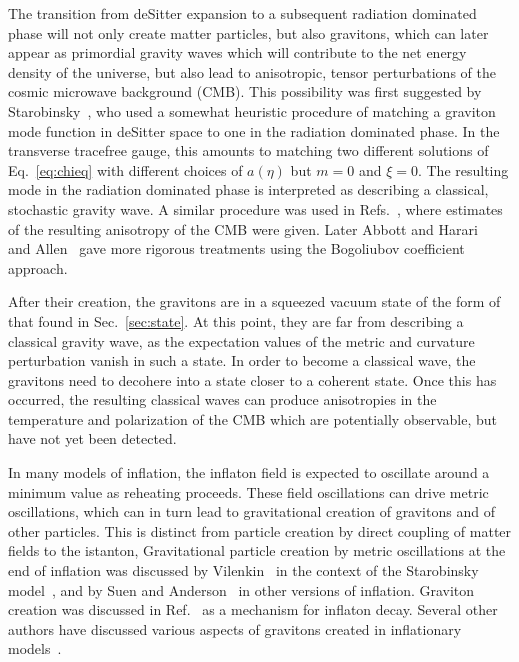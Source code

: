 \documentclass[12pt,onecolumn,eqsecnum,floats,aps,prd,floatfix,titlepage]{revtex4-2}
\begin{document}
The transition from deSitter expansion to a subsequent radiation dominated phase will not only create matter particles,
but also gravitons, which can later appear as primordial gravity waves which will contribute to the net energy density
of the universe, but also lead to anisotropic, tensor perturbations of the cosmic microwave background (CMB). This possibility
was first suggested by Starobinsky~\cite{S79}, who used a  somewhat heuristic procedure of matching  a graviton mode
function in deSitter space to one in the radiation dominated phase. In the transverse tracefree gauge, this amounts to
matching two different solutions of Eq.~\eqref{eq:chieq} with different choices of $a(\eta)$ but $m=0$ and $\xi =0$.
The resulting mode in the radiation dominated phase  is interpreted as describing a classical, stochastic gravity wave.
A similar procedure was used in Refs.~\cite{RSV82,FP83,AW84a,AW84b}, where estimates of the resulting anisotropy
of the CMB were given. Later Abbott and Harari~\cite{AH86} and Allen~\cite{A88} gave more rigorous treatments using
the Bogoliubov coefficient approach.

After their creation, the gravitons are in a squeezed vacuum state of the form of that found in Sec.~\ref{sec:state}. At
this point, they are far from describing a classical gravity wave, as the expectation values of the metric and curvature
perturbation vanish in such a state. In order to become a classical wave, the gravitons need to decohere into a state
closer to a coherent state.
Once this has occurred, the resulting classical waves can produce anisotropies in the temperature and polarization of the
CMB which are potentially  observable, but have not yet been detected.

In many models of inflation, the inflaton field is expected to oscillate around a minimum value as reheating proceeds.
These field oscillations can drive metric oscillations, which can in turn lead to gravitational creation of gravitons and
of other particles. This is distinct from particle creation by direct coupling of matter fields to the istanton, Gravitational
particle creation by metric oscillations at the end of inflation was discussed by Vilenkin~\cite{Vilenkin:1985} in the context of the
Starobinsky model~\cite{Starobinsky80}, and by Suen and Anderson~\cite{SA87} in other  versions of inflation.
Graviton creation was discussed in Ref.~\cite{Ema:2015}  as a mechanism for inflaton decay. 
Several other authors have discussed various aspects of gravitons created in inflationary 
models~\cite{Yainik90,Grishchuk-Sidorov90,Maia93,Henriques94,Mendes99,Allen2000,Henriques04,Giovannini20}. 
\end{document}
